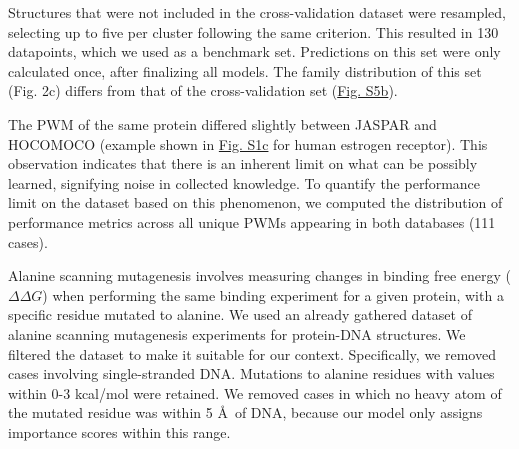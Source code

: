 \par
Structures that were not included in the cross-validation dataset were resampled, selecting up to five per cluster following the same criterion. This resulted in 130 datapoints, which we used as a benchmark set. Predictions on this set were only calculated once, after finalizing all models. The family distribution of this set (Fig. 2c) differs from that of the cross-validation set (\hyperref[fig:pdnaS5]{Fig. S5b}).
\par
The PWM of the same protein differed slightly between JASPAR and HOCOMOCO (example shown in \hyperref[fig:pdnaS1]{Fig. S1c} for human estrogen receptor). This observation indicates that there is an inherent limit on what can be possibly learned, signifying noise in collected knowledge. To quantify the performance limit on the dataset based on this phenomenon, we computed the distribution of performance metrics across all unique PWMs appearing in both databases (111 cases). 
\par
Alanine scanning mutagenesis involves measuring changes in binding free energy ($\Delta\Delta G$) when performing the same binding experiment for a given protein, with a specific residue mutated to alanine. We used an already gathered dataset \citep{Peng2018} of alanine scanning mutagenesis experiments for protein-DNA structures. We filtered the dataset to make it suitable for our context. Specifically, we removed cases involving single-stranded DNA. Mutations to alanine residues with  values within 0-3 kcal/mol were retained. We removed cases in which no heavy atom of the mutated residue was within 5 \AA\ of DNA, because our model only assigns importance scores within this range.
